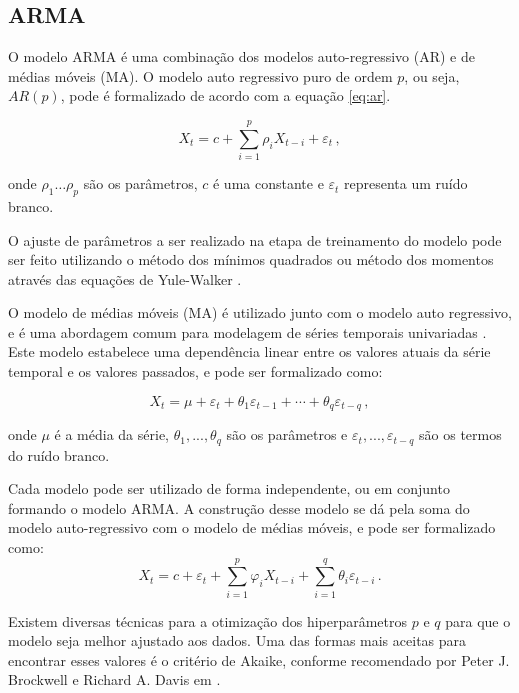\subsection{ARMA}
O modelo ARMA é uma combinação dos modelos auto-regressivo (AR) e de médias móveis (MA). O modelo auto regressivo puro de ordem $p$, ou seja, $AR(p)$, pode é formalizado de acordo com a equação \eqref{eq:ar}.

\begin{equation}\label{eq:ar}
    X_{t}=c+\sum ^{p}_{i=1}\rho _{i}X_{t-i}+\varepsilon _{t}\, ,
\end{equation}

onde $\rho _{1}\ldots \rho _{p}$ são os parâmetros, $c$ é uma constante e $\varepsilon _{t}$ representa um ruído branco.

O ajuste de parâmetros a ser realizado na etapa de treinamento do modelo pode ser feito utilizando o método dos mínimos quadrados ou método dos momentos através das equações de Yule-Walker \cite{box&jenkins}.

O modelo de médias móveis (MA) é utilizado junto com o modelo auto regressivo, e é uma abordagem comum para modelagem de séries temporais univariadas \cite{box&jenkins}. Este modelo estabelece uma dependência linear entre os valores atuais da série temporal e os valores passados, e pode ser formalizado como:

\begin{equation}
    X_{t}=\mu+\varepsilon_{t}+\theta_{1} \varepsilon_{t-1}+\cdots+\theta_{q} \varepsilon_{t-q}\, ,
\end{equation}

onde $\mu$ é a média da série, $\theta_{1}, ..., \theta_{q}$ são os parâmetros e $\varepsilon_{t}, ..., \varepsilon_{t-q}$ são os termos do ruído branco.

Cada modelo pode ser utilizado de forma independente, ou em conjunto formando o modelo ARMA. A construção desse modelo se dá pela soma do modelo auto-regressivo com o modelo de médias móveis, e pode ser formalizado como:
\begin{equation}
    X_{t}=c+\varepsilon_{t}+\sum_{i=1}^{p} \varphi_{i} X_{t-i}+\sum_{i=1}^{q} \theta_{i} \varepsilon_{t-i}\, .
\end{equation}

Existem diversas técnicas para a otimização dos hiperparâmetros $p$ e $q$ para que o modelo seja melhor ajustado aos dados. Uma das formas mais aceitas para encontrar esses valores é o critério de Akaike, conforme recomendado por Peter J. Brockwell e Richard A. Davis em \cite{akaike}.


